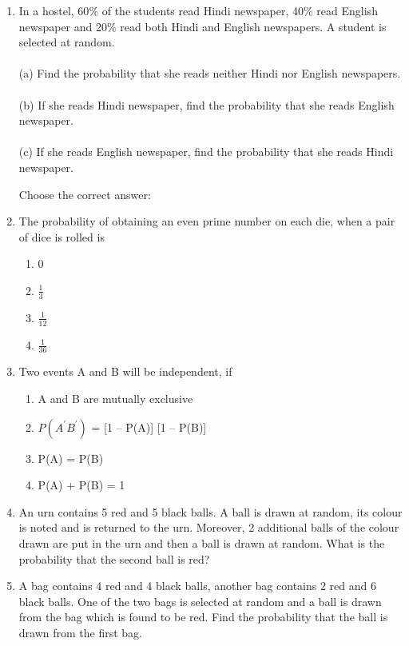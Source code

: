 \begin{enumerate}[label=\arabic*.,ref=\thesubsection.\theenumi]
\item In a hostel, 60$\%$ of the students read Hindi newspaper, 40$\%$ read English newspaper and 20$\%$ read both Hindi and English newspapers. A student is selected at random.\\
\\(a) Find the probability that she reads neither Hindi nor English newspapers.\\
\\(b) If she reads Hindi newspaper, find the probability that she reads English newspaper.\\
\\(c) If she reads English newspaper, find the probability that she reads Hindi newspaper.\\
\solution


Choose the correct answer: 
\item The probability of obtaining an even prime number on each die, when a pair of dice is rolled is
\begin{enumerate}
\item 0
\item $\frac{1}{3}$
\item $\frac{1}{12}$
\item $\frac{1}{36}$
\end{enumerate}
\solution


\item Two events A and B will be independent, if
\begin{enumerate}
\item A and B are mutually exclusive
\item $P(A^{\prime}B^{\prime})$ = [1 – P(A)] [1 – P(B)]
\item P(A) = P(B)
\item P(A) + P(B) = 1
\end{enumerate}
\solution


\item An urn contains 5 red and 5 black balls. A ball is drawn at random, its colour is noted and is returned to the urn. Moreover, 2 additional balls of the colour drawn are put in the urn and then a ball is drawn at random. What is the probability that the second ball is red?\\
\solution


\item A bag contains 4 red and 4 black balls, another bag contains 2 red and 6 black balls. One of the two bags is selected at random and a ball is drawn from the bag which is found to be red. Find the probability that the ball is drawn from the first bag.\\
\solution



\end{enumerate}
